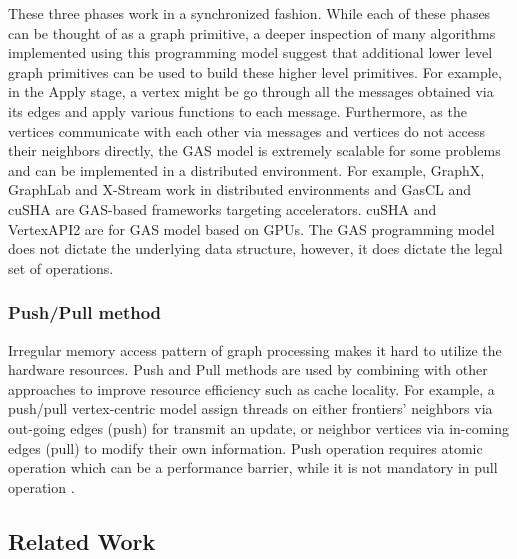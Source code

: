 These three phases work in a synchronized fashion. While each of these phases can be thought of as a graph primitive, a deeper inspection of many algorithms implemented using this programming model suggest that additional lower level graph primitives can be used to build these higher level primitives. For example, in the Apply stage, a vertex might be go through all the messages obtained via its edges and apply various functions to each message. Furthermore, as the vertices communicate with each other via messages and vertices do not access their neighbors directly, the GAS model is extremely scalable for some problems and can be implemented in a distributed environment. For example, GraphX\cite{xin2013graphx}, GraphLab\cite{low2012distributed} and X-Stream work in distributed environments and GasCL\cite{che2014gascl} and cuSHA\cite{cusha} are GAS-based frameworks targeting accelerators. cuSHA and VertexAPI2 are for GAS model based on GPUs.
The GAS programming model does not dictate the underlying data structure, however, it does dictate the legal set of operations. 

\subsubsection{Push/Pull method}
Irregular memory access pattern of graph processing makes it hard to utilize the hardware resources. Push and Pull methods are used by combining with other approaches to improve resource efficiency such as cache locality. For example, a push/pull vertex-centric model assign threads on either frontiers' neighbors via out-going edges (push) for transmit an update, or neighbor vertices via in-coming edges (pull) to modify their own information. Push operation requires atomic operation which can be a performance barrier, while it is not mandatory in pull operation \cite{Lakhotia:2019:GCM:3293883.3299108}. 


\subsection{Related Work}
\label{sub:related-work}

